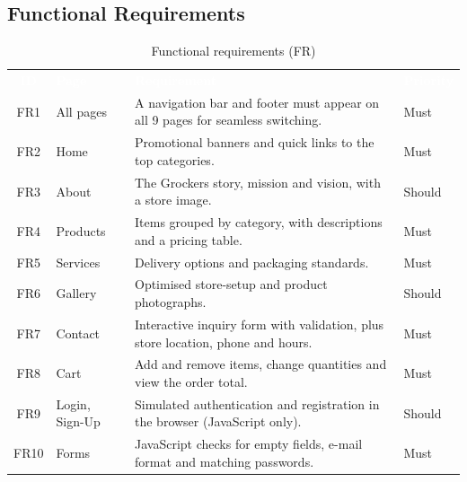 \documentclass[10pt,a4paper]{article}
\newcommand{\hc}[1]{\textcolor{white}{\bfseries #1}}
\newcommand{\tbl}{\rowcolors{2}{white}{gkbg}\renewcommand{\arraystretch}{1.2}\footnotesize}
\begin{document}
\subsection{Functional Requirements}
\begin{table}[H]
\centering
\caption{Functional requirements (FR)}\label{tab:fr}
\tbl
\begin{tabularx}{\textwidth}{@{}clYl@{}}
\hc{ID} & \hc{Page} & \hc{Requirement} & \hc{Priority}\\
FR1 & All pages & A navigation bar and footer must appear on all 9 pages for seamless switching. & Must\\
FR2 & Home & Promotional banners and quick links to the top categories. & Must\\
FR3 & About & The Grockers story, mission and vision, with a store image. & Should\\
FR4 & Products & Items grouped by category, with descriptions and a pricing table. & Must\\
FR5 & Services & Delivery options and packaging standards. & Must\\
FR6 & Gallery & Optimised store-setup and product photographs. & Should\\
FR7 & Contact & Interactive inquiry form with validation, plus store location, phone and hours. & Must\\
FR8 & Cart & Add and remove items, change quantities and view the order total. & Must\\
FR9 & Login, Sign-Up & Simulated authentication and registration in the browser (JavaScript only). & Should\\
FR10 & Forms & JavaScript checks for empty fields, e-mail format and matching passwords. & Must\\
\end{tabularx}
\end{table}
\end{document}
